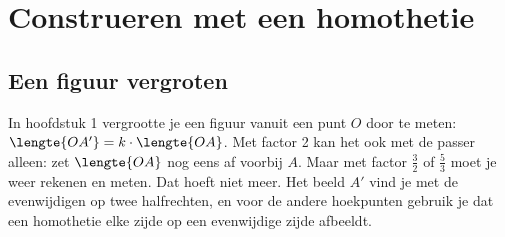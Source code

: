 \begin{oefeningen}
\end{oefeningen}

\section{Construeren met een homothetie}

\subsection{Een figuur vergroten}

In hoofdstuk 1 vergrootte je een figuur vanuit een punt $O$ door te meten: $\lengte{OA'} = k \cdot \lengte{OA}$. Met factor 2 kan het ook met de passer alleen: zet $\lengte{OA}$ nog eens af voorbij $A$. Maar met factor $\tfrac32$ of $\tfrac53$ moet je weer rekenen en meten. Dat hoeft niet meer. Het beeld $A'$ vind je met de evenwijdigen op twee halfrechten, en voor de andere hoekpunten gebruik je dat een homothetie elke zijde op een evenwijdige zijde afbeeldt.


